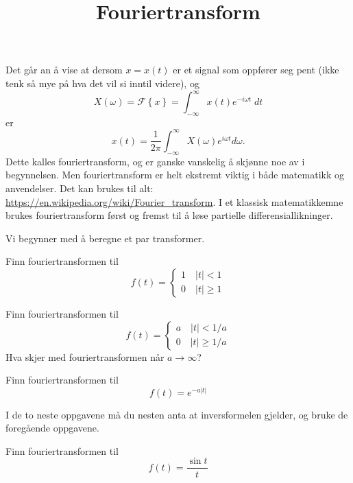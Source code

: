 \title{Fouriertransform}








\maketitle




Det går an å vise at dersom $x=x(t)$ er et signal som oppfører seg pent (ikke tenk så mye på hva det vil si inntil videre), 
og
\[
X(\omega) = \mathcal{F}\left\{ x \right\}=\int_{-\infty}^{\infty} x(t)e^{-i\omega t}\;dt
\]
er
\[
x(t) = \frac{1}{2\pi}\int_{-\infty}^{\infty}X(\omega)e^{i\omega t}d\omega.
\]
Dette kalles fouriertransform, 
og er ganske vanskelig å skjønne noe av i begynnelsen. 
Men fouriertransform er helt ekstremt viktig i både matematikk og anvendelser. 
Det kan brukes til alt: \url{https://en.wikipedia.org/wiki/Fourier_transform}.
I et klassisk matematikkemne brukes fouriertransform først og fremst til å løse partielle differensiallikninger.

Vi begynner med å beregne et par transformer. 

\begin{oppgave}{1}
Finn fouriertransformen til 
\[
f(t)=
\begin{cases} 
1 \quad |t|<1 \\
0 \quad |t|\geq 1
\end{cases}
\]
\end{oppgave}

\begin{oppgave}{2}
Finn fouriertransformen til 
\[
f(t)=
\begin{cases} 
a \quad |t|<1/a \\
0 \quad |t|\geq 1/a
\end{cases}
\]
Hva skjer med fouriertransformen når $a\to \infty$?
\end{oppgave}

\begin{oppgave}{3}
Finn fouriertransformen til
\[
f(t)=e^{-a|t|}
\]
\end{oppgave}

I de to neste oppgavene må du nesten anta at inversformelen gjelder, og bruke de foregående oppgavene.

\begin{oppgave}{4}
Finn fouriertransformen til 
\[
f(t)=\frac{\sin t}{t}
\]
\end{oppgave}

